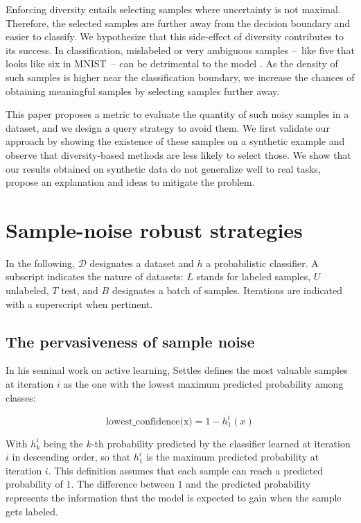 \documentclass[runningheads]{llncs}
\newcommand{\C}[1]{\mathcal{#1}}
\begin{document}
Enforcing diversity entails selecting samples where uncertainty
is not maximal. Therefore, the selected samples are further away from
the decision boundary and easier to classify. We hypothesize that this side-effect of diversity
contributes to its success. In classification, mislabeled or very ambiguous samples
--~like five that looks like six in MNIST~-- can be detrimental to the model \cite{northcutt2021pervasive}. As the density of such
samples is higher near the classification boundary, we increase the chances of obtaining meaningful samples by selecting samples further away.

This paper proposes a metric to evaluate the quantity of such noisy samples in a dataset, and we design a query strategy
to avoid them. We first validate our approach by showing the existence of these samples on a synthetic example and observe that diversity-based methods are less
likely to select those. We show that our results obtained on synthetic data do not generalize well to real tasks,
propose an explanation and ideas to mitigate the problem.

\section{Sample-noise robust strategies}

In the following, $\C{D}$ designates a dataset and $h$ a probabilistic classifier. A subscript indicates the nature of datasets: $L$ stands for labeled samples, $U$ unlabeled, $T$  test, and $B$ designates a batch of samples. Iterations are indicated with a superscript when pertinent.

\subsection{The pervasiveness of sample noise}

In his seminal work on active learning, Settles \cite{settles2009active} defines
the most valuable samples at iteration $i$ as the one with the lowest maximum predicted probability among classes:

$$\text{lowest\_confidence(x)} = 1 - h^i_{1}(x)$$

With $h^i_k$ being the $k$-th probability predicted by the classifier learned at iteration $i$ in descending order, so that $h^i_{1}$ is the maximum predicted probability at iteration $i$. This definition assumes that each sample can reach a predicted probability of $1$. The difference between $1$ and the predicted probability represents the information that the model is expected to gain when the sample gets labeled.
\end{document}
